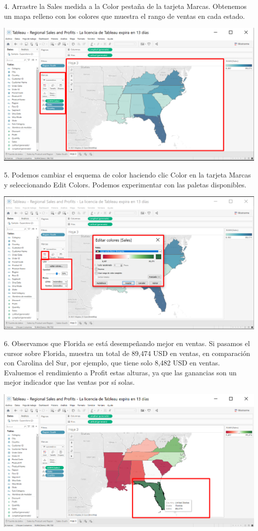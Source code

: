 \documentclass[12pt,letterpaper]{article}
\begin{document}
4. Arrastre la Sales medida a la Color pestaña de la tarjeta Marcas. Obtenemos un mapa relleno
con los colores que muestra el rango de ventas en cada estado.
\begin{center}
    \includegraphics[width=16cm]{img/23.png}  
\end{center}
5. Podemos cambiar el esquema de color haciendo clic Color en la tarjeta Marcas y
seleccionando Edit Colors. Podemos experimentar con las paletas disponibles.
\begin{center}
    \includegraphics[width=16cm]{img/24.png}  
\end{center}
6. Observamos que Florida se está desempeñando mejor en ventas. Si pasamos el cursor sobre
Florida, muestra un total de 89,474 USD en ventas, en comparación con Carolina del Sur, por
ejemplo, que tiene solo 8,482 USD en ventas. Evaluemos el rendimiento a Profit estas
alturas, ya que las ganancias son un mejor indicador que las ventas por sí solas.
\begin{center}
    \includegraphics[width=16cm]{img/25.png}  
\end{center}
\end{document}
